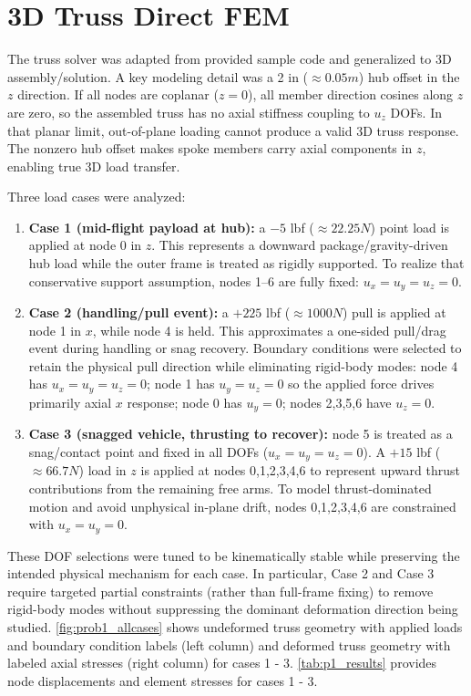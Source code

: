 \documentclass{article}
\begin{document}
\section*{3D Truss Direct FEM}
The truss solver was adapted from provided sample code and generalized to 3D assembly/solution. A key modeling detail was a 2 in ($\approx 0.05 m$) hub offset in the $z$ direction. If all nodes are coplanar ($z=0$), all member direction cosines along $z$ are zero, so the assembled truss has no axial stiffness coupling to $u_z$ DOFs. In that planar limit, out-of-plane loading cannot produce a valid 3D truss response. The nonzero hub offset makes spoke members carry axial components in $z$, enabling true 3D load transfer. 

Three load cases were analyzed:
\begin{enumerate}
    \setlength{\itemsep}{1pt}
    \setlength{\parskip}{0pt}
    \setlength{\parsep}{0pt}
    \item \textbf{Case 1 (mid-flight payload at hub):} a $-5$ lbf ($\approx 22.25 N $) point load is applied at node 0 in $z$. This represents a downward package/gravity-driven hub load while the outer frame is treated as rigidly supported. To realize that conservative support assumption, nodes 1--6 are fully fixed: $u_x=u_y=u_z=0$.
    \item \textbf{Case 2 (handling/pull event):} a $+225$ lbf ($\approx 1000 N $) pull is applied at node 1 in $x$, while node 4 is held. This approximates a one-sided pull/drag event during handling or snag recovery. Boundary conditions were selected to retain the physical pull direction while eliminating rigid-body modes: node 4 has $u_x=u_y=u_z=0$; node 1 has $u_y=u_z=0$ so the applied force drives primarily axial $x$ response; node 0 has $u_y=0$; nodes 2,3,5,6 have $u_z=0$.
    \item \textbf{Case 3 (snagged vehicle, thrusting to recover):} node 5 is treated as a snag/contact point and fixed in all DOFs ($u_x=u_y=u_z=0$). A $+15$ lbf ($\approx 66.7 N$) load in $z$ is applied at nodes 0,1,2,3,4,6 to represent upward thrust contributions from the remaining free arms. To model thrust-dominated motion and avoid unphysical in-plane drift, nodes 0,1,2,3,4,6 are constrained with $u_x=u_y=0$.
\end{enumerate}

These DOF selections were tuned to be kinematically stable while preserving the intended physical mechanism for each case. In particular, Case 2 and Case 3 require targeted partial constraints (rather than full-frame fixing) to remove rigid-body modes without suppressing the dominant deformation direction being studied. \autoref{fig:prob1_allcases} shows undeformed truss geometry with applied loads and boundary condition labels (left column) and deformed truss geometry with labeled axial stresses (right column) for cases 1 - 3. \autoref{tab:p1_results} provides node displacements and element stresses for cases 1 - 3.
\end{document}
